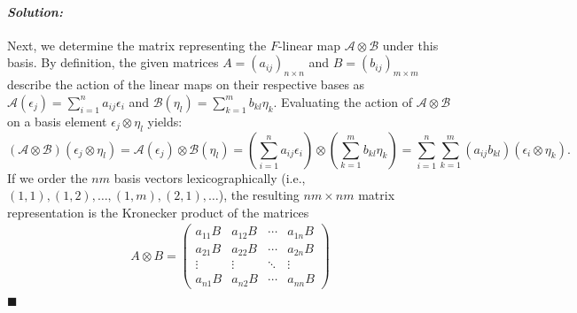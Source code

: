 \documentclass[12pt, a4paper]{article}
\newenvironment{solution}
  {\paragraph{\textit{Solution:}}\par\medskip}
  {\hfill$\blacksquare$\vspace{0.1cm}}
\begin{document}
\begin{solution}
    Next, we determine the matrix representing the $F$-linear map $\mathscr{A} \otimes \mathscr{B}$ under this basis. 
    By definition, the given matrices $A = (a_{ij})_{n \times n}$ and $B = (b_{ij})_{m \times m}$ describe the action of the linear maps on their respective bases as $\mathscr{A}(\epsilon_j) = \sum_{i=1}^n a_{ij} \epsilon_i$ and $\mathscr{B}(\eta_l) = \sum_{k=1}^m b_{kl} \eta_k$. 
    Evaluating the action of $\mathscr{A} \otimes \mathscr{B}$ on a basis element $\epsilon_j \otimes \eta_l$ yields:$$(\mathscr{A} \otimes \mathscr{B})(\epsilon_j \otimes \eta_l) = \mathscr{A}(\epsilon_j) \otimes \mathscr{B}(\eta_l) = \left(\sum_{i=1}^n a_{ij} \epsilon_i\right) \otimes \left(\sum_{k=1}^m b_{kl} \eta_k\right) = \sum_{i=1}^n \sum_{k=1}^m (a_{ij} b_{kl}) (\epsilon_i \otimes \eta_k).$$
    If we order the $nm$ basis vectors lexicographically (i.e., $(1,1), (1,2), \dots, (1,m), (2,1), \dots$), the resulting $nm \times nm$ matrix representation is the Kronecker product of the matrices
    \begin{align*}
        A \otimes B = \begin{pmatrix} a_{11}B & a_{12}B & \cdots & a_{1n}B \\ a_{21}B & a_{22}B & \cdots & a_{2n}B \\ \vdots & \vdots & \ddots & \vdots \\ a_{n1}B & a_{n2}B & \cdots & a_{nn}B \end{pmatrix}
    \end{align*}
\end{solution}
\end{document}
